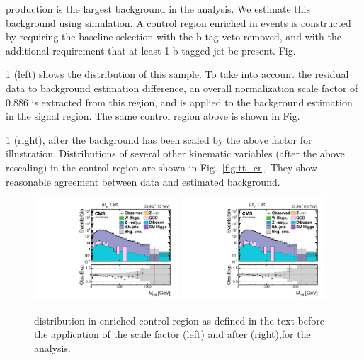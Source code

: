\ttb production is the largest background in the \Hmue analysis. We estimate this background using simulation. A control region enriched in \ttb events is constructed by requiring the baseline selection with the b-tag veto removed, and with the additional requirement that at least 1 b-tagged jet be present. Fig.~{\ref{fig:tt_cr_nosf} (left) shows the \mcol distribution of this sample. To take into account the residual data to background estimation difference, an overall normalization scale factor of 0.886 is extracted from this region, and is applied to the background estimation in the signal region. The same control region above is shown in Fig.~{\ref{fig:tt_cr_nosf} (right), after the background has been scaled by the above factor for illustration. Distributions of several other kinematic variables (after the above rescaling) in the \ttb control region are shown in Fig.~\ref{fig:tt_cr}. They show reasonable agreement between data and estimated background.

\begin{figure}[htpb]
  \begin{center}

    \includegraphics[width=0.48\textwidth]{plots_and_figures/chapter6/tt_cr_hm/ttbarNoSF.pdf}
    \includegraphics[width=0.48\textwidth]{plots_and_figures/chapter6/tt_cr_hm/ttbarSF.pdf}
  \end{center}
  \caption{\mcol distribution in \ttb enriched control region as defined in the text before the application of the scale factor (left) and after (right),for the \Hmue analysis.}
  \label{fig:tt_cr_nosf}
\end{figure}

}}
